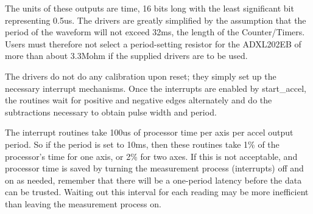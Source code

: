 \documentclass{article}
\begin{document}
The units of these outputs are time, 16 bits long with the least
significant bit representing 0.5us.  The drivers are greatly
simplified by the assumption that the period of the waveform will not
exceed 32ms, the length of the Counter/Timers.  Users must therefore
not select a period-setting resistor for the ADXL202EB of more than
about 3.3Mohm if the supplied drivers are to be used. 

The drivers do not do any calibration upon reset; they simply set up
the necessary interrupt mechanisms.  Once the interrupts are enabled by
start\_accel, the routines wait for positive and negative edges alternately
and do the subtractions necessary to obtain pulse width and period.

The interrupt routines take 100us of processor time per axis per accel
output period.  So if the period is set to 10ms, then these routines
take 1\% of the processor's time for one axis, or 2\% for two axes.  If
this is not acceptable, and processor time is saved by turning the
measurement process (interrupts) off and on as needed, remember that
there will be a one-period latency before the data can be trusted.
Waiting out this interval for each reading may be more inefficient
than leaving the measurement process on.
\end{document}
